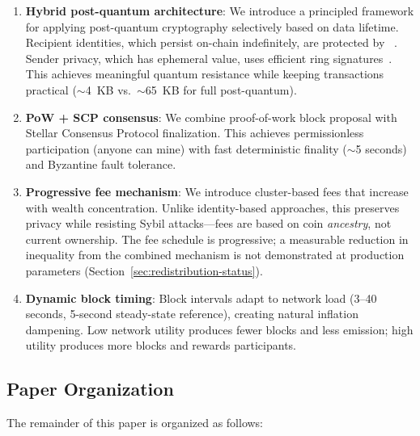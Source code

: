 \begin{enumerate}
  \item \textbf{Hybrid post-quantum architecture}: We introduce a principled
    framework for applying post-quantum cryptography selectively based on
    data lifetime. Recipient identities, which persist on-chain
    indefinitely, are protected by ~\cite{fips203,kyber}. Sender privacy, which has
    ephemeral value, uses efficient \CLSAG ring signatures~\cite{clsag}. This achieves
    meaningful quantum resistance while keeping transactions practical
    ($\sim$4~KB vs.\ $\sim$65~KB for full post-quantum).

  \item \textbf{PoW + SCP consensus}: We combine proof-of-work block
    proposal with Stellar Consensus Protocol finalization. This achieves
    permissionless participation (anyone can mine) with fast deterministic
    finality ($\sim$5 seconds) and Byzantine fault tolerance.

  \item \textbf{Progressive fee mechanism}: We introduce cluster-based
    fees that increase with wealth concentration. Unlike identity-based
    approaches, this preserves privacy while resisting Sybil attacks---fees
    are based on coin \textit{ancestry}, not current ownership. The fee
    schedule is progressive; a measurable reduction in inequality from the
    combined mechanism is not demonstrated at production parameters
    (Section~\ref{sec:redistribution-status}).

  \item \textbf{Dynamic block timing}: Block intervals adapt to network
    load (3--40 seconds, 5-second steady-state reference), creating
    natural inflation dampening. Low
    network utility produces fewer blocks and less emission; high utility
    produces more blocks and rewards participants.
\end{enumerate}

\subsection{Paper Organization}

The remainder of this paper is organized as follows:

